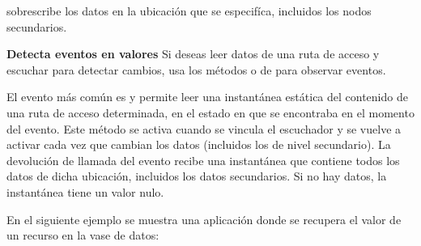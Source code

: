 %
\begin{sphinxVerbatim}[commandchars=\\\{\}]
     
  
     
     
      
\end{sphinxVerbatim}

 sobrescribe los datos en la ubicación que se especifíca, incluidos
los nodos secundarios.


\textbf{Detecta eventos en valores}
\label{\detokenize{firebase_web:detecta-eventos-en-valores}}
Si deseas leer datos de una ruta de acceso y escuchar para detectar cambios,
usa los métodos  o  de 
para observar eventos.

El evento más común es  y permite leer una instantánea estática del
contenido de una ruta de acceso determinada, en el estado en que se encontraba
en el momento del evento. Este método se activa cuando se vincula el escuchador
y se vuelve a activar cada vez que cambian los datos (incluidos los de
nivel secundario). La devolución de llamada del evento recibe una instantánea
que contiene todos los datos de dicha ubicación, incluidos los datos
secundarios. Si no hay datos, la instantánea tiene un valor nulo.

En el siguiente ejemplo se muestra una aplicación donde se recupera el valor
de un recurso en la vase de datos:

%
\begin{sphinxVerbatim}[commandchars=\\\{\}]
   
  
\end{sphinxVerbatim}

